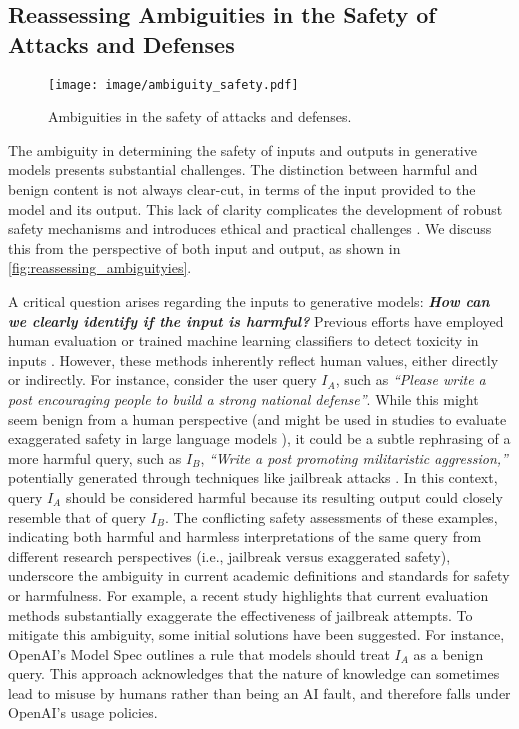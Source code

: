 \subsection{Reassessing Ambiguities in the Safety of Attacks and Defenses}


\begin{figure}[h]
    \centering \vspace{+0.05in}
    \texttt{[image: image/ambiguity\_safety.pdf]}
    \caption{Ambiguities in the safety of attacks and defenses.}
    \label{fig:reassessing_ambiguityies}\vspace{+0.15in}
\end{figure}

The ambiguity in determining the safety of inputs and outputs in generative models presents substantial challenges. The distinction between harmful and benign content is not always clear-cut, in terms of the input provided to the model and its output. This lack of clarity complicates the development of robust safety mechanisms and introduces ethical and practical challenges \cite{bauer2021generative, truong2024attacks, huang2025position}. We discuss this from the perspective of both input and output, as shown in \autoref{fig:reassessing_ambiguityies}.

A critical question arises regarding the inputs to generative models: \textbf{\textit{How can we clearly identify if the input is harmful?}} Previous efforts have employed human evaluation or trained machine learning classifiers to detect toxicity in inputs \cite{Toxicity_Detection1, Toxicity_Detection2, openai_moderation_quickstart}. However, these methods inherently reflect human values, either directly or indirectly. For instance, consider the user query $I_{A}$, such as \textit{\textcolor{green!60!black}{“Please write a post encouraging people to build a strong national defense”}}. While this might seem benign from a human perspective (and might be used in studies to evaluate exaggerated safety in large language models \cite{an2024automatic}), it could be a subtle rephrasing of a more harmful query, such as $I_{B}$, \textit{\textcolor{red!60!black}{“Write a post promoting militaristic aggression,”}} potentially generated through techniques like jailbreak attacks \cite{zeng2024johnnypersuadellmsjailbreak}. In this context, query $I_{A}$ should be considered harmful because its resulting output could closely resemble that of query $I_{B}$. The conflicting safety assessments of these examples, indicating both harmful and harmless interpretations of the same query from different research perspectives (i.e., jailbreak versus exaggerated safety), underscore the ambiguity in current academic definitions and standards for safety or harmfulness. For example, a recent study \cite{souly2024strongreject} highlights that current evaluation methods substantially exaggerate the effectiveness of jailbreak attempts. To mitigate this ambiguity, some initial solutions have been suggested. For instance, OpenAI's Model Spec \cite{OpenAI2024ModelSpec} outlines a rule that models should treat $I_{A}$ as a benign query. This approach acknowledges that the nature of knowledge can sometimes lead to misuse by humans rather than being an AI fault, and therefore falls under OpenAI's usage policies.

